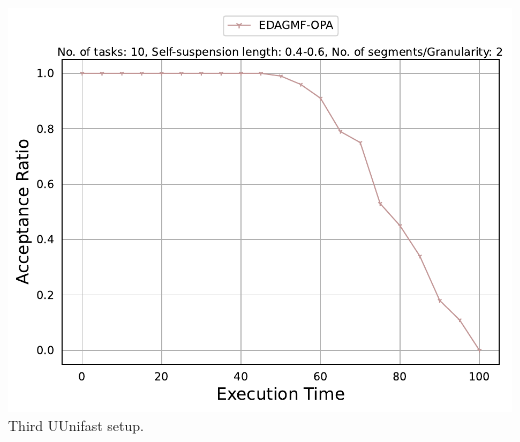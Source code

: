 \documentclass[]{article}
\begin{document}
\begin{minipage}[t]{0.48\linewidth}
            \includegraphics[width=\linewidth]{EDAGMF-OPA[2][0.4-0.6][10].pdf}
		Third UUnifast setup.
		\vspace{0.3cm}

		

		
	\end{minipage}\hfill
\end{document}
